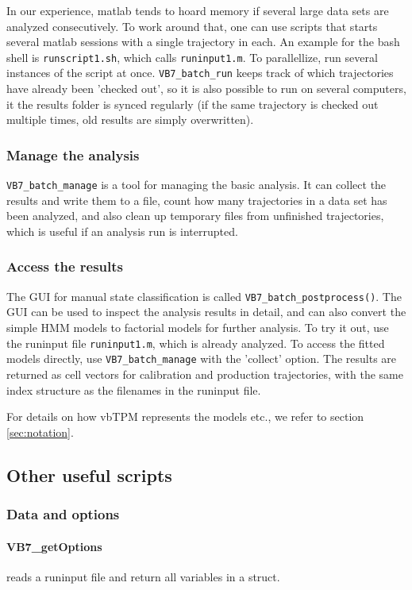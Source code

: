 In our experience, matlab tends to hoard memory if several large data
sets are analyzed consecutively.  To work around that, one can use
scripts that starts several matlab sessions with a single trajectory
in each. An example for the bash shell is \verb+runscript1.sh+, which
calls \verb+runinput1.m+. To parallellize, run several instances of
the script at once. \verb+VB7_batch_run+ keeps track of which
trajectories have already been 'checked out', so it is also possible
to run on several computers, it the results folder is synced regularly
(if the same trajectory is checked out multiple times, old results are
simply overwritten).


\subsubsection*{Manage the analysis}
\verb+VB7_batch_manage+ is a tool for managing the basic analysis. It
can collect the results and write them to a file, count how many
trajectories in a data set has been analyzed, and also clean up
temporary files from unfinished trajectories, which is useful if an
analysis run is interrupted.

\subsubsection*{Access the results} 
The GUI for manual state classification is called
\verb+VB7_batch_postprocess()+. The GUI can be used to inspect the
analysis results in detail, and can also convert the simple HMM models
to factorial models for further analysis. To try it out, use the
runinput file \verb+runinput1.m+, which is already analyzed. To access
the fitted models directly, use \verb+VB7_batch_manage+ with the
'collect' option. The results are returned as cell vectors for
calibration and production trajectories, with the same index structure
as the filenames in the runinput file.

For details on how vbTPM represents the models etc., we refer to
section \ref{sec:notation}.

\subsection{Other useful scripts}
\subsubsection{Data and options}
\paragraph{VB7\_getOptions} 
reads a runinput file and return all variables in a struct.
